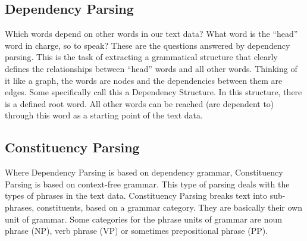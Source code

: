 \subsection{Dependency Parsing}
Which words depend on other words in our text data? What word is the “head” word in charge, so to speak? These are the questions answered by dependency parsing. This is the task of extracting a grammatical structure that clearly defines the relationships between “head” words and all other words. Thinking of it like a graph, the words are nodes and the dependencies between them are edges. Some specifically call this a Dependency Structure. In this structure, there is a defined root word. All other words can be reached (are dependent to) through this word as a starting point of the text data. 

\subsection{Constituency Parsing}
Where Dependency Parsing is based on dependency grammar, Constituency Parsing is based on context-free grammar. This type of parsing deals with the types of phrases in the text data. Constituency Parsing breaks text into sub-phrases, constituents, based on a grammar category. They are basically their own unit of grammar. Some categories for the phrase units of grammar are noun phrase (NP), verb phrase (VP) or sometimes prepositional phrase (PP).
